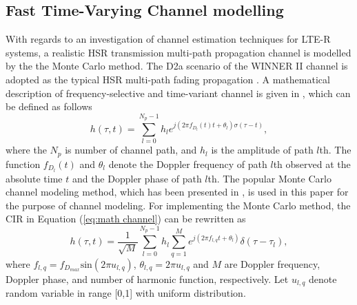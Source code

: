 \documentclass[12pt,journal,draftclsnofoot,onecolumn]{IEEEtran}
\begin{document}
\subsection{Fast Time-Varying Channel modelling}\label{section-2.1}

With regards to an investigation of channel estimation techniques for LTE-R systems, a realistic HSR transmission multi-path propagation channel is modelled by the the Monte Carlo method. The D2a scenario of the WINNER II channel is adopted as the typical HSR multi-path fading propagation \cite{Guan2011}. A mathematical description of frequency-selective and time-variant channel is given in \cite{Matz2011}, which can be defined as follows
%
\begin{equation}\label{eq:math channel}
	h(\tau,t)=\sum_{l=0}^{N_p-1}h_l e^{j(2\pi f_{D_l}(t)t+\theta_{l})\sigma (\tau-t)},
\end{equation}
%
where the $N_{p}$ is number of channel path, and $h_{l}$ is the amplitude of path $l$th. The function $f_{D_l}(t)$ and $\theta_{l}$ denote the Doppler frequency of path $l$th observed at the absolute time $t$ and the Doppler phase of path $l$th. The popular Monte Carlo channel modeling method, which has been presented in \cite{Nguyen2004}, is used in this paper for the purpose of channel modeling. For implementing the Monte Carlo method, the CIR in Equation (\ref{eq:math channel}) can be rewritten as
%
\begin{equation}\label{eq-math Monte channel}
	h(\tau,t)=\frac{1}{\sqrt{M}}\sum_{l=0}^{N_p-1}h_{l}\sum_{q=1}^{M}e^{j(2\pi f_{l,q}t+\theta_{l})}\delta(\tau-\tau_{l}),
\end{equation}
%
where $f_{l,q} = f_{D_{max}} \text{sin}(2\pi u_{l,q})$, $\theta_{l,q} = 2\pi u_{l,q}$ and $M$ are Doppler frequency, Doppler phase, and number of harmonic function, respectively. Let $u_{l,q}$ denote random variable in range [0,1] with uniform distribution. 
	
\end{document}
